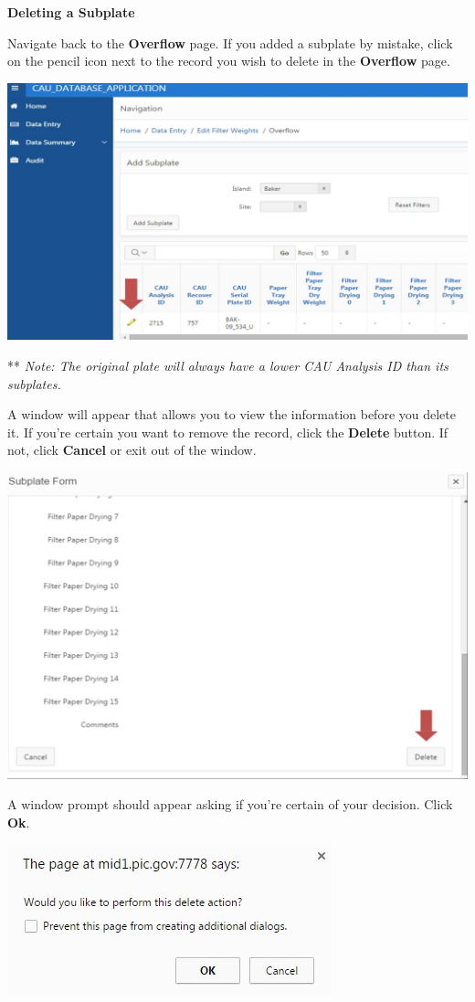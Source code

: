 \documentclass[]{book}
\begin{document}
\textbf{Deleting a Subplate}

Navigate back to the \textbf{Overflow} page. If you added a subplate by mistake, click on the pencil icon next to the record you wish to delete in the \textbf{Overflow} page.

\includegraphics{images/Data22.jpg}

** \emph{Note: The original plate will always have a lower CAU Analysis ID than its subplates.}

A window will appear that allows you to view the information before you delete it. If you're certain you want to remove the record, click the \textbf{Delete} button. If not, click \textbf{Cancel} or exit out of the window.

\includegraphics{images/Data23.jpg}

A window prompt should appear asking if you're certain of your decision. Click \textbf{Ok}.

\includegraphics{images/Data24.jpg}
\end{document}
